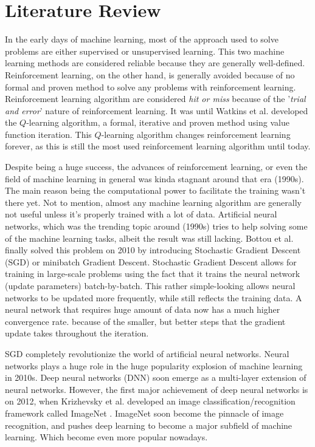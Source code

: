         	\section{Literature Review}
        	In the early days of machine learning, most of the approach used to solve problems are either supervised or unsupervised learning. This two machine learning methods are considered reliable because they are generally well-defined. Reinforcement learning, on the other hand, is generally avoided because of no formal and proven method to solve any problems with reinforcement learning. Reinforcement learning algorithm are considered \textit{hit or miss} because of the '\textit{trial and error}' nature of reinforcement learning. It was until Watkins et al. \cite{Watkins:1989} developed the $Q$-learning algorithm, a formal, iterative and proven method using value function iteration. This $Q$-learning algorithm changes reinforcement learning forever, as this is still the most used reinforcement learning algorithm until today.
            \par
            Despite being a huge success, the advances of reinforcement learning, or even the field of machine learning in general was kinda stagnant around that era (1990s). The main reason being the computational power to facilitate the training wasn't there yet. Not to mention, almost any machine learning algorithm are generally not useful unless it's properly trained with a lot of data. Artificial neural networks, which was the trending topic around (1990s) tries to help solving some of the machine learning tasks, albeit the result was still lacking. Bottou et al. \cite{Bottou2010} finally solved this problem on 2010 by introducing Stochastic Gradient Descent (SGD) or minibatch Gradient Descent. Stochastic Gradient Descent allows for training in large-scale problems using the fact that it trains the neural network (update parameters) batch-by-batch. This rather simple-looking allows neural networks to be updated more frequently, while still reflects the training data. A neural network that requires huge amount of data now has a much higher convergence rate. because of the smaller, but better steps that the gradient update takes throughout the iteration.
            \par
            SGD completely revolutionize the world of artificial neural networks. Neural networks plays a huge role in the huge popularity explosion of machine learning in 2010s. Deep neural networks (DNN) soon emerge as a multi-layer extension of neural networks. However, the first major achievement of deep neural networks is on 2012, when Krizhevsky et al. developed an image classification/recognition framework called ImageNet \cite{Krizhevsky:2012:ICD:2999134.2999257}. ImageNet soon become the pinnacle of image recognition, and pushes deep learning to become a major subfield of machine learning. Which become even more popular nowadays. 
